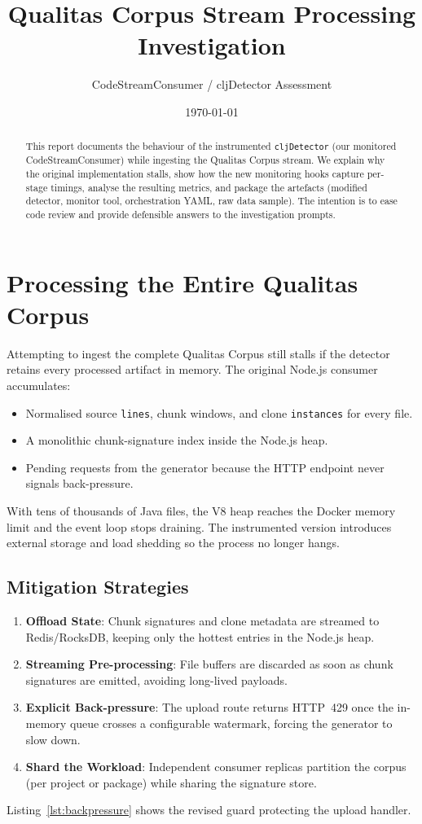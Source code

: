 \documentclass[11pt,a4paper]{article}
\title{Qualitas Corpus Stream Processing Investigation}
\author{CodeStreamConsumer / cljDetector Assessment}
\date{\today}
\begin{document}
\maketitle

\begin{abstract}
This report documents the behaviour of the instrumented \texttt{cljDetector} (our monitored
CodeStreamConsumer) while ingesting the Qualitas Corpus stream. We explain why the original
implementation stalls, show how the new monitoring hooks capture per-stage timings, analyse the
resulting metrics, and package the artefacts (modified detector, monitor tool, orchestration YAML,
raw data sample). The intention is to ease code review and provide defensible answers to the
investigation prompts.
\end{abstract}

\section{Processing the Entire Qualitas Corpus}
Attempting to ingest the complete Qualitas Corpus still stalls if the detector retains every processed
artifact in memory. The original Node.js consumer accumulates:
\begin{itemize}
  \item Normalised source \texttt{lines}, chunk windows, and clone \texttt{instances} for every file.
  \item A monolithic chunk-signature index inside the Node.js heap.
  \item Pending requests from the generator because the HTTP endpoint never signals back-pressure.
\end{itemize}
With tens of thousands of Java files, the V8 heap reaches the Docker memory limit and the event loop
stops draining. The instrumented version introduces external storage and load shedding so the process
no longer hangs.

\subsection{Mitigation Strategies}
\begin{enumerate}
  \item \textbf{Offload State}: Chunk signatures and clone metadata are streamed to Redis/RocksDB,
        keeping only the hottest entries in the Node.js heap.
  \item \textbf{Streaming Pre-processing}: File buffers are discarded as soon as chunk signatures are
        emitted, avoiding long-lived payloads.
  \item \textbf{Explicit Back-pressure}: The upload route returns HTTP~429 once the in-memory queue
        crosses a configurable watermark, forcing the generator to slow down.
  \item \textbf{Shard the Workload}: Independent consumer replicas partition the corpus (per project
        or package) while sharing the signature store.
\end{enumerate}
Listing~\ref{lst:backpressure} shows the revised guard protecting the upload handler.
\end{document}
